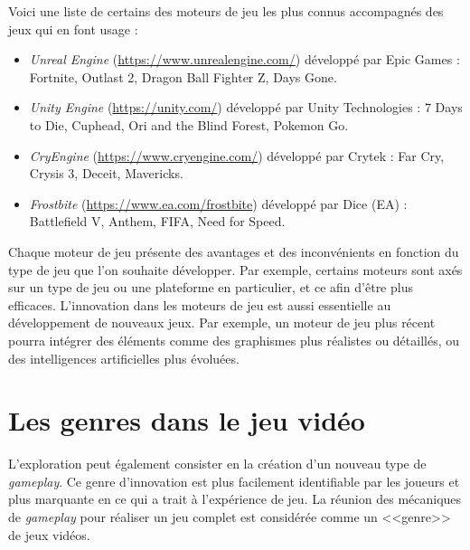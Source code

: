 Voici une liste de certains des moteurs de jeu les plus connus accompagnés des jeux qui en font usage : 
\begin{itemize}
    \item \emph{Unreal Engine} (\url{https://www.unrealengine.com/}) développé par Epic Games : Fortnite, Outlast 2, Dragon Ball Fighter Z, Days Gone.
    \item \emph{Unity Engine} (\url{https://unity.com/}) développé par Unity Technologies : 7 Days to Die, Cuphead, Ori and the Blind Forest, Pokemon Go.
    \item \emph{CryEngine} (\url{https://www.cryengine.com/}) développé par Crytek : Far Cry, Crysis 3, Deceit, Mavericks.
    \item \emph{Frostbite} (\url{https://www.ea.com/frostbite}) développé par Dice (EA) : Battlefield V, Anthem, FIFA, Need for Speed.
\end{itemize}

Chaque moteur de jeu présente des avantages et des inconvénients en fonction du type de jeu que l'on souhaite développer.
Par exemple, certains moteurs sont axés sur un type de jeu ou une plateforme en particulier, et ce afin d'être plus efficaces. 
L'innovation dans les moteurs de jeu est aussi essentielle au développement de nouveaux jeux. 
Par exemple, un moteur de jeu plus récent pourra intégrer des éléments comme des graphismes plus réalistes ou détaillés, ou des intelligences artificielles plus évoluées.

\section{Les genres dans le jeu vidéo}
L'exploration peut également consister en la création d'un nouveau type de \emph{gameplay}.
Ce genre d'innovation est plus facilement identifiable par les joueurs et plus marquante en ce qui a trait \`a l'expérience de jeu.
La réunion des mécaniques de \emph{gameplay} pour réaliser un jeu complet est considérée comme un <<genre>> de jeux vidéos.


